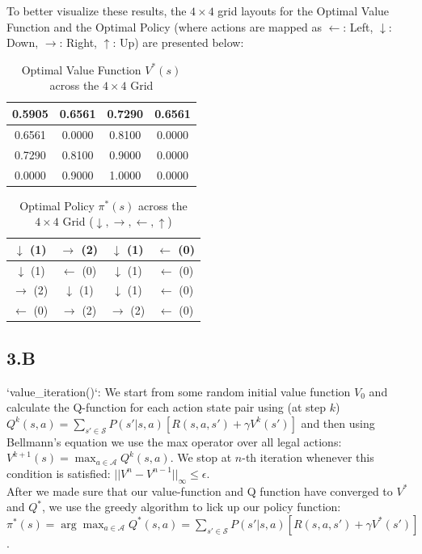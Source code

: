 \documentclass{article}
\begin{document}
\begin{enumerate}
    To better visualize these results, the $4 \times 4$ grid layouts for the Optimal Value Function and the Optimal Policy (where actions are mapped as $\leftarrow$: Left, $\downarrow$: Down, $\rightarrow$: Right, $\uparrow$: Up) are presented below:

    \begin{table}[htbp]
    \centering
    \caption{Optimal Value Function $V^*(s)$ across the $4 \times 4$ Grid}
    \begin{tabular}{|c|c|c|c|}
    \hline
    0.5905 & 0.6561 & 0.7290 & 0.6561 \\ \hline
    0.6561 & 0.0000 & 0.8100 & 0.0000 \\ \hline
    0.7290 & 0.8100 & 0.9000 & 0.0000 \\ \hline
    0.0000 & 0.9000 & 1.0000 & 0.0000 \\ \hline
    \end{tabular}
    \end{table}

    \begin{table}[htbp]
    \centering
    \caption{Optimal Policy $\pi^*(s)$ across the $4 \times 4$ Grid ($\downarrow, \rightarrow, \leftarrow, \uparrow$)}
    \begin{tabular}{|c|c|c|c|}
    \hline
    $\downarrow$ (1) & $\rightarrow$ (2) & $\downarrow$ (1) & $\leftarrow$ (0) \\ \hline
    $\downarrow$ (1) & $\leftarrow$ (0) & $\downarrow$ (1) & $\leftarrow$ (0) \\ \hline
    $\rightarrow$ (2) & $\downarrow$ (1) & $\downarrow$ (1) & $\leftarrow$ (0) \\ \hline
    $\leftarrow$ (0) & $\rightarrow$ (2) & $\rightarrow$ (2) & $\leftarrow$ (0) \\ \hline
    \end{tabular}
    \end{table}


    
\subsection*{3.B}


     `value\_iteration()`:
     We start from some random initial value function $V_0$ and calculate the Q-function for each action state pair using (at step $k$) $Q^k(s,a) = \sum_{s'\in \mathcal{S}} P(s'|s,a) [ R(s,a, s') + \gamma V^k(s') ] $ and then using Bellmann's equation we use the max operator over all legal actions: $V^{k+1}(s) = \max_{a \in \mathcal{A}} Q^k(s,a)$. We stop at $n$-th iteration whenever this condition is satisfied: $
    ||V^n - V^{n-1}||_\infty \leq \epsilon$. \\ 
    After we made sure that our value-function and Q function have converged to $V^*$ and $Q^*$, we use the greedy algorithm to lick up our policy function: $\pi^*(s) = \arg\max_{a \in \mathcal{A}} Q^*(s,a) = \sum_{s'\in \mathcal{S}} P(s'|s,a) [ R(s,a, s') + \gamma V^*(s') ]$. 


\end{enumerate}
\end{document}
